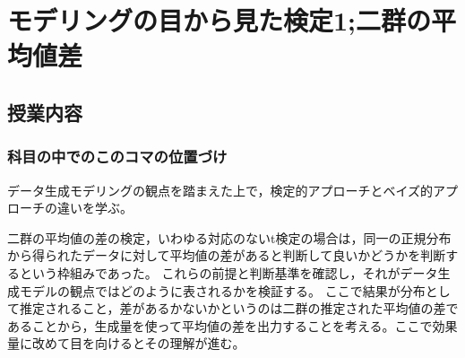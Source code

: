 \section{モデリングの目から見た検定1;二群の平均値差}
\subsection{授業内容}
\subsubsection{科目の中でのこのコマの位置づけ}
データ生成モデリングの観点を踏まえた上で，検定的アプローチとベイズ的アプローチの違いを学ぶ。

二群の平均値の差の検定，いわゆる対応のないt検定の場合は，同一の正規分布から得られたデータに対して平均値の差があると判断して良いかどうかを判断するという枠組みであった。
これらの前提と判断基準を確認し，それがデータ生成モデルの観点ではどのように表されるかを検証する。
ここで結果が分布として推定されること，差があるかないかというのは二群の推定された平均値の差であることから，生成量を使って平均値の差を出力することを考える。ここで効果量に改めて目を向けるとその理解が進む。

